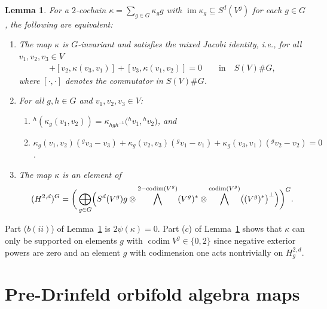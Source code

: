 \documentclass[10pt,a4paper]{amsart}
\numberwithin{equation}{section}
\newtheorem{Lemma}[Theorem]{Lemma}
\newcommand{\actby}[1]{{}^{#1}}
\DeclareMathOperator{\im}{im}
\DeclareMathOperator{\codim}{codim}
\begin{document}
\begin{Lemma}\label{ineedaname}
	For a $2$-cochain $\kappa=\sum_{g\in G}\kappa_g g$ with $\im \kappa_g\subseteq S^d(V^g)$ for each $g\in G$,
	the following are equivalent:
	\begin{enumerate}\itemsep=0pt
		\item[$(a)$] The map $\kappa$ is $G$-invariant and satisfies
		the mixed Jacobi identity, i.e., for all $v_1,v_2,v_3\in V$
		\begin{gather*}
		[v_1,\kappa(v_2,v_3)]+[v_2,\kappa(v_3,v_1)]+[v_3,\kappa(v_1,v_2)]=0\qquad
\text{in}\quad S(V)\# G,
		\end{gather*}
		where $[\cdot,\cdot]$ denotes the commutator in $S(V)\# G$.
		\item[$(b)$] For all $g,h\in G$ and $v_1,v_2,v_3\in V$:
		\begin{enumerate}\itemsep=0pt
			\item[$(i)$] $\actby{h}(\kappa_g(v_1,v_2))=\kappa_{hgh^{-1}}\big(\actby{h}v_1,\actby{h}v_2\big)$, and
			\item[$(ii)$] $\kappa_g(v_1,v_2)(\actby{g}v_3-v_3)
			+\kappa_g(v_2,v_3)(\actby{g}v_1-v_1)
			+\kappa_g(v_3,v_1)(\actby{g}v_2-v_2)=0$.
		\end{enumerate}
		\item[$(c)$] The map $\kappa$ is an element of
		\begin{gather*}
		(H^{2,d})^G=\bigg(\bigoplus_{g \in G}
		\Bigl(
		S^d(V^{g})g \otimes
		\bigwedge^{2-\codim(V^g)}(V^g)^{*} \otimes
		\bigwedge^{\codim(V^g)}\bigl((V^g)^*\bigr)^{\perp}
		\Bigr)\bigg)^G.
		\end{gather*}
	\end{enumerate}
\end{Lemma}

\begin{Remark}\label{remark:codim}
	Part ($b(ii)$) of Lemma~\ref{ineedaname} is $2\psi(\kappa)=0$.
	Part ($c$) of Lemma~\ref{ineedaname} shows that $\kappa$ can only be supported
	on elements $g$ with $\codim V^g\in\{0,2\}$ since negative exterior powers
	are zero and an element $g$ with codimension one acts nontrivially on $H_g^{2,d}$.
\end{Remark}

\section{Pre-Drinfeld orbifold algebra maps}\label{InvSkewSymmBilMaps}
\end{document}
